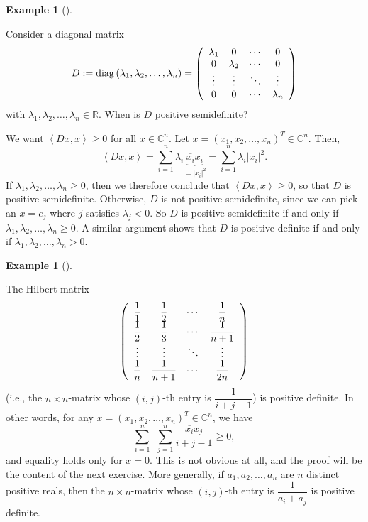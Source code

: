 \documentclass[numbers=enddot,12pt,final,onecolumn,notitlepage]{scrartcl}%
\newcounter{exer}
\numberwithin{exer}{subsection}
\theoremstyle{definition}
\newtheorem{exam}[theo]{Example}
\newenvironment{example}[1][]
{\begin{exam}[#1]\begin{leftbar}}
{\end{leftbar}\end{exam}}
\let\sumnonlimits\sum
\renewcommand{\sum}{\sumnonlimits\limits}
\begin{document}
\begin{example}
Consider a diagonal matrix
\[
D:=\operatorname*{diag}\left(  \lambda_{1},\lambda_{2},\ldots,\lambda
_{n}\right)  =\left(
\begin{array}
[c]{cccc}%
\lambda_{1} & 0 & \cdots & 0\\
0 & \lambda_{2} & \cdots & 0\\
\vdots & \vdots & \ddots & \vdots\\
0 & 0 & \cdots & \lambda_{n}%
\end{array}
\right)
\]
with $\lambda_{1},\lambda_{2},\ldots,\lambda_{n}\in\mathbb{R}$. When is $D$
positive semidefinite?

We want $\left\langle Dx,x\right\rangle \geq0$ for all $x\in\mathbb{C}^{n}$.
Let $x=\left(  x_{1},x_{2},\ldots,x_{n}\right)  ^{T}\in\mathbb{C}^{n}$. Then,%
\[
\left\langle Dx,x\right\rangle =\sum_{i=1}^{n}\lambda_{i}\underbrace{\overline
{x_{i}}x_{i}}_{=\left\vert x_{i}\right\vert ^{2}}=\sum_{i=1}^{n}\lambda
_{i}\left\vert x_{i}\right\vert ^{2}.
\]
If $\lambda_{1},\lambda_{2},\ldots,\lambda_{n}\geq0$, then we therefore
conclude that $\left\langle Dx,x\right\rangle \geq0$, so that $D$ is positive
semidefinite. Otherwise, $D$ is not positive semidefinite, since we can pick
an $x=e_{j}$ where $j$ satisfies $\lambda_{j}<0$. So $D$ is positive
semidefinite if and only if $\lambda_{1},\lambda_{2},\ldots,\lambda_{n}\geq0$.
A similar argument shows that $D$ is positive definite if and only if
$\lambda_{1},\lambda_{2},\ldots,\lambda_{n}>0$.
\end{example}

\begin{example}
The Hilbert matrix%
\[
\left(
\begin{array}
[c]{cccc}%
\dfrac{1}{1} & \dfrac{1}{2} & \cdots & \dfrac{1}{n}\\
\dfrac{1}{2} & \dfrac{1}{3} & \cdots & \dfrac{1}{n+1}\\
\vdots & \vdots & \ddots & \vdots\\
\dfrac{1}{n} & \dfrac{1}{n+1} & \cdots & \dfrac{1}{2n}%
\end{array}
\right)
\]
(i.e., the $n\times n$-matrix whose $\left(  i,j\right)  $-th entry is
$\dfrac{1}{i+j-1}$) is positive definite. In other words, for any $x=\left(
x_{1},x_{2},\ldots,x_{n}\right)  ^{T}\in\mathbb{C}^{n}$, we have%
\[
\sum_{i=1}^{n}\ \ \sum_{j=1}^{n}\dfrac{\overline{x_{i}}x_{j}}{i+j-1}\geq0,
\]
and equality holds only for $x=0$. This is not obvious at all, and the proof
will be the content of the next exercise. More generally, if $a_{1}%
,a_{2},\ldots,a_{n}$ are $n$ distinct positive reals, then the $n\times
n$-matrix whose $\left(  i,j\right)  $-th entry is $\dfrac{1}{a_{i}+a_{j}}$ is
positive definite.
\end{example}
\end{document}

